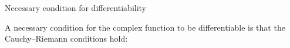 \EMhold


\begin{EMtheorem}{Necessary condition for differentiability}

A necessary condition for the complex function  to be differentiable is that the Cauchy--Riemann conditions hold:

\end{EMtheorem}

